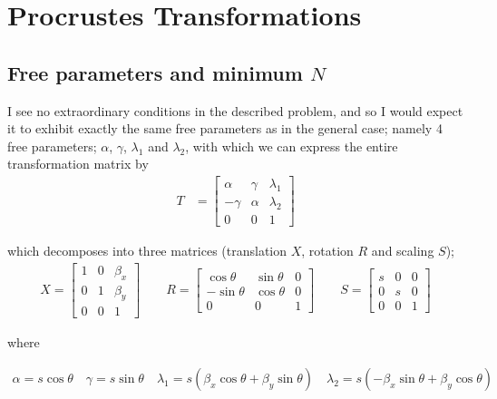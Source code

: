 %
%

\section{Procrustes Transformations}

\subsection{Free parameters and minimum $N$}
I see no extraordinary conditions in the described problem, and so I would
expect it to exhibit exactly the same free parameters as in the general case;
namely 4 free parameters; $\alpha$, $\gamma$, $\lambda_1$ and $\lambda_2$,
with which we can express the entire transformation matrix by
\begin{align}
    \label{eqn:procrustes}
    T &=
    \begin{bmatrix}
        \alpha & \gamma & \lambda_1 \\
        -\gamma & \alpha & \lambda_2 \\
        0 & 0 & 1
    \end{bmatrix}
\end{align}

which decomposes into three matrices (translation $X$, rotation $R$ and
scaling $S$);
\begin{align}
    X =
    \begin{bmatrix}
        1 & 0 & \beta_x \\
        0 & 1 & \beta_y \\
        0 & 0 & 1
    \end{bmatrix}
    \qquad
    R =
    \begin{bmatrix}
        \cos \theta & \sin \theta & 0 \\
        -\sin \theta & \cos \theta & 0 \\
        0 & 0 & 1
    \end{bmatrix}
    \qquad
    S =
    \begin{bmatrix}
        s & 0 & 0 \\
        0 & s & 0 \\
        0 & 0 & 1
    \end{bmatrix}
\end{align}

where

\begin{align}
    \alpha = s \cos \theta \quad
    \gamma = s \sin \theta \quad
    \lambda_1 = s(\beta_x \cos \theta + \beta_y \sin \theta) \quad
    \lambda_2 = s(-\beta_x \sin \theta + \beta_y \cos \theta)
\end{align}

